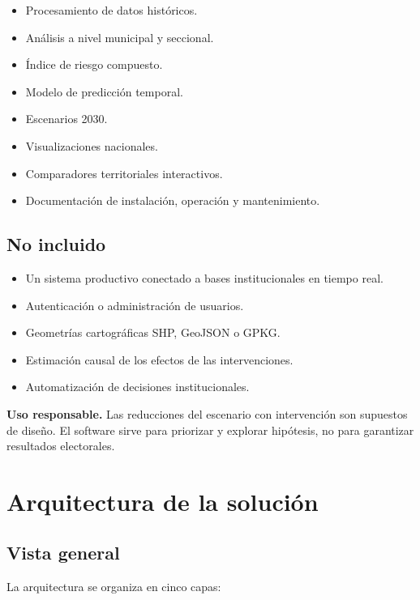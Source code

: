 \documentclass[11pt,a4paper]{article}
\begin{document}
\begin{itemize}
    \item Procesamiento de datos históricos.
    \item Análisis a nivel municipal y seccional.
    \item Índice de riesgo compuesto.
    \item Modelo de predicción temporal.
    \item Escenarios 2030.
    \item Visualizaciones nacionales.
    \item Comparadores territoriales interactivos.
    \item Documentación de instalación, operación y mantenimiento.
\end{itemize}

\subsection{No incluido}

\begin{itemize}
    \item Un sistema productivo conectado a bases institucionales en tiempo real.
    \item Autenticación o administración de usuarios.
    \item Geometrías cartográficas SHP, GeoJSON o GPKG.
    \item Estimación causal de los efectos de las intervenciones.
    \item Automatización de decisiones institucionales.
\end{itemize}

\begin{warning}
\textbf{Uso responsable.} Las reducciones del escenario con intervención son supuestos de diseño. El software sirve para priorizar y explorar hipótesis, no para garantizar resultados electorales.
\end{warning}

\section{Arquitectura de la solución}

\subsection{Vista general}

La arquitectura se organiza en cinco capas:
\end{document}
